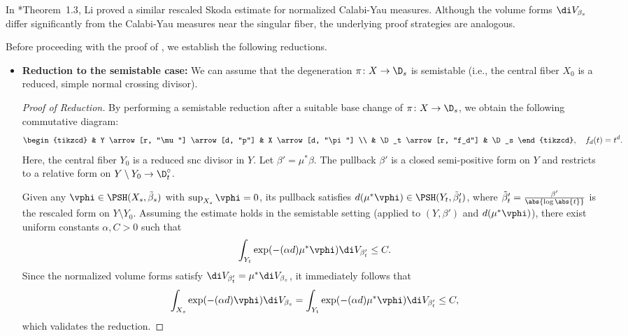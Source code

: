 \documentclass[12pt]{amsart}
\begin{document}
\begin{remark}
    In \cite{Li2024}*{Theorem~1.3}, Li proved a similar rescaled Skoda estimate for normalized Calabi-Yau measures. Although the volume forms $\di V_{\beta_s}$ differ significantly from the Calabi-Yau measures near the singular fiber, the underlying proof strategies are analogous.
\end{remark}

Before proceeding with the proof of , we establish the following reductions.

\begin{itemize}
    \item \textbf{Reduction to the semistable case:} We can assume that the degeneration $\pi \colon X \to \D_s$ is semistable (i.e., the central fiber $X_0$ is a reduced, simple normal crossing divisor).

    \begin{proof}[Proof of Reduction]
        By performing a semistable reduction after a suitable base change of $\pi \colon X \to \D_s$, we obtain the following commutative diagram:
        \[
        \begin{tikzcd}
            & Y  \arrow[r, "\mu"] \arrow[d, "p"] & X \arrow[d, "\pi"] \\
            & \D_t \arrow[r, "f_d"] & \D_s
        \end{tikzcd}, \quad f_d(t) = t^d.
        \]
        Here, the central fiber $Y_0$ is a reduced snc divisor in $Y$. Let $\beta' = \mu^* \beta$. The pullback $\beta'$ is a closed semi-positive form on $Y$ and restricts to a relative \Kahler form on $Y \setminus Y_0 \to \D_t^\circ$.

        Given any $\vphi \in \PSH(X_s, \tilde{\beta}_s)$ with $\sup_{X_s} \vphi = 0$, its pullback satisfies $d (\mu^* \vphi) \in \PSH(Y_t, \tilde{\beta}'_t)$, where $\tilde{\beta}'_t
        = \frac{\beta'}{\abs{\log\abs{t}}}$ is the rescaled form 
        on $Y \setminus Y_0$. Assuming the estimate holds in the semistable setting (applied to $(Y, \beta')$ and $ d (\mu^* \vphi)$), there exist uniform constants $\alpha, C > 0$ such that
        \[
        \int_{Y_t} \exp(-(\alpha d) \mu^* \vphi) \di V_{\beta'_t} \leq C.
        \]
        Since the normalized volume forms satisfy $\di V_{\beta'_t} = \mu^*\di V_{\beta_s}$, it immediately follows that
        \[
        \int_{X_s} \exp(-(\alpha d) \vphi) \di V_{\beta_s} = \int_{Y_t} \exp(-(\alpha d) \mu^* \vphi) \di V_{\beta'_t} \leq C,
        \]
        which validates the reduction.
    \end{proof}


\end{itemize}
\end{document}
